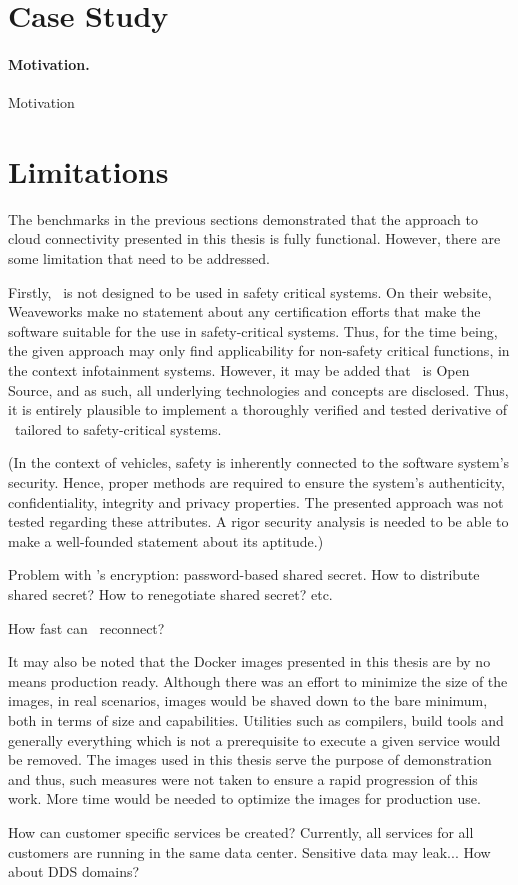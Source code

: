 %
%
%
%
%
%
%
%
%
%

\section{Case Study}

\paragraph{Motivation.} Motivation

%
%
%
%
%
%
%
%
%
%


\section{Limitations}

The benchmarks in the previous sections demonstrated that the approach to cloud connectivity presented in this thesis is fully functional. However, there are some limitation that need to be addressed.

Firstly, \wnet\ is not designed to be used in safety critical systems. On their website, Weaveworks make no statement about any certification efforts that make the software suitable for the use in safety-critical systems. Thus, for the time being, the given approach may only find applicability for non-safety critical functions, \eg in the context infotainment systems. However, it may be added that \wnet\ is Open Source, and as such, all underlying technologies and concepts are disclosed. Thus, it is entirely plausible to implement a thoroughly verified and tested derivative of \wnet\ tailored to safety-critical systems.

(In the context of vehicles, safety is inherently connected to the software system's security. Hence, proper methods are required to ensure the system's authenticity, confidentiality, integrity and privacy properties. The presented approach was not tested regarding these attributes. A rigor security analysis is needed to be able to make a well-founded statement about its aptitude.)

Problem with \wnet 's encryption: password-based shared secret. How to distribute shared secret? How to renegotiate shared secret? etc.

How fast can \wnet\ reconnect?

It may also be noted that the Docker images presented in this thesis are by no means production ready. Although there was an effort to minimize the size of the images, in real scenarios, images would be shaved down to the bare minimum, both in terms of size and capabilities. Utilities such as compilers, build tools and generally everything which is not a prerequisite to execute a given service would be removed. The images used in this thesis serve the purpose of demonstration and thus, such measures were not taken to ensure a rapid progression of this work. More time would be needed to optimize the images for production use.


How can customer specific services be created? Currently, all services for all customers are running in the same data center. Sensitive data may leak... How about DDS domains?

%
%
%
%
%
%
%
%
%
%
%
%
%
%
%
%
%
%
%
%
%
%
%
%
%
%
%
%
%
%
%
%